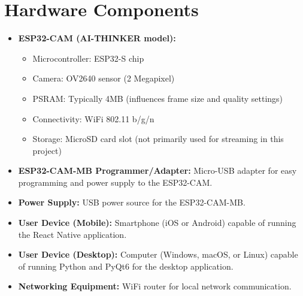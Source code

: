 \documentclass[12pt, a4paper]{report}
\begin{document}
\section{Hardware Components}
\begin{itemize}
    \item \textbf{ESP32-CAM (AI-THINKER model):}
        \begin{itemize}
            \item Microcontroller: ESP32-S chip
            \item Camera: OV2640 sensor (2 Megapixel)
            \item PSRAM: Typically 4MB (influences frame size and quality settings)
            \item Connectivity: WiFi 802.11 b/g/n
            \item Storage: MicroSD card slot (not primarily used for streaming in this project)
        \end{itemize}
    \item \textbf{ESP32-CAM-MB Programmer/Adapter:} Micro-USB adapter for easy programming and power supply to the ESP32-CAM.
    \item \textbf{Power Supply:} USB power source for the ESP32-CAM-MB.
    \item \textbf{User Device (Mobile):} Smartphone (iOS or Android) capable of running the React Native application.
    \item \textbf{User Device (Desktop):} Computer (Windows, macOS, or Linux) capable of running Python and PyQt6 for the desktop application.
    \item \textbf{Networking Equipment:} WiFi router for local network communication.
\end{itemize}
\end{document}
